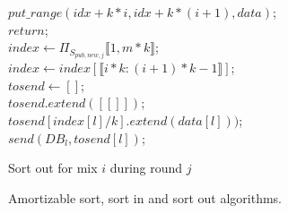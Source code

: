 \documentclass{llncs}
\begin{document}
\begin{figure}
\begin{minipage}[t]{0.475\textwidth}
\begin{algorithm}[H]
{
	$put\_range(idx+k*i, idx+k*(i+1), data)$;\\
	$return$;\\
}
$index \gets {\Pi}_{S_{pub,new,j}} \llbracket 1, m*k \rrbracket$;\\
$index \gets index[\llbracket i*k: (i+1)*k-1\rrbracket]$;\\
$tosend \gets []$;\\
{
	$tosend.extend([[]])$;\\
}
{
	$tosend[index[l]/k].extend(data[l]))$;\\
}
{
	$send(DB_l, tosend[l])$;\\
}
\caption{Sort out for mix $i$ during round $j$}
\label{alg:SortOUT}
\end{algorithm}
\end{minipage}
\caption{Amortizable sort, sort in and sort out algorithms.}
\end{figure}
\end{document}
